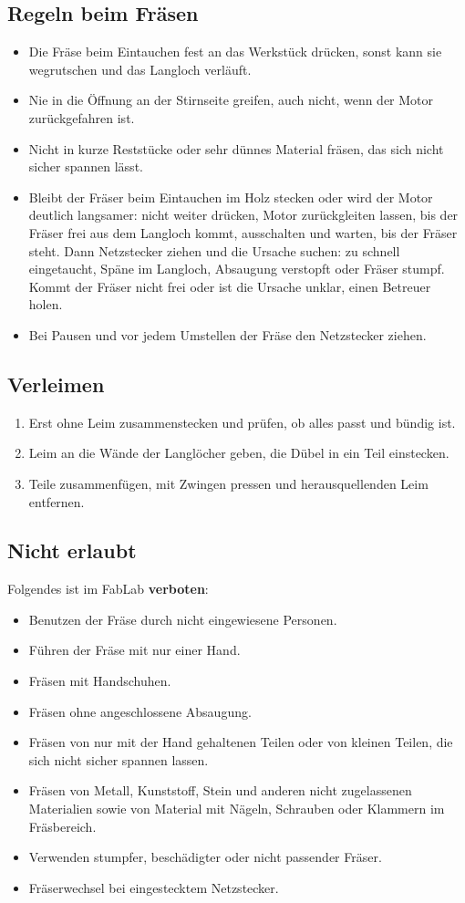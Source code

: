 \documentclass{\basedir/fablab-document}
\begin{document}
	\subsection{Regeln beim Fräsen}
	\begin{itemize}
		\item Die Fräse beim Eintauchen fest an das Werkstück drücken, sonst kann sie wegrutschen und das Langloch verläuft.
		\item Nie in die Öffnung an der Stirnseite greifen, auch nicht, wenn der Motor zurückgefahren ist.
		\item Nicht in kurze Reststücke oder sehr dünnes Material fräsen, das sich nicht sicher spannen lässt.
		\item Bleibt der Fräser beim Eintauchen im Holz stecken oder wird der Motor deutlich langsamer: nicht weiter drücken, Motor zurückgleiten lassen, bis der Fräser frei aus dem Langloch kommt, ausschalten und warten, bis der Fräser steht. Dann Netzstecker ziehen und die Ursache suchen: zu schnell eingetaucht, Späne im Langloch, Absaugung verstopft oder Fräser stumpf. Kommt der Fräser nicht frei oder ist die Ursache unklar, einen Betreuer holen.
		\item Bei Pausen und vor jedem Umstellen der Fräse den Netzstecker ziehen.
	\end{itemize}

	\subsection{Verleimen}
	\begin{enumerate}
		\item Erst ohne Leim zusammenstecken und prüfen, ob alles passt und bündig ist.
		\item Leim an die Wände der Langlöcher geben, die Dübel in ein Teil einstecken.
		\item Teile zusammenfügen, mit Zwingen pressen und herausquellenden Leim entfernen.
	\end{enumerate}

	\subsection{Nicht erlaubt}
	Folgendes ist im FabLab \textbf{verboten}:
	\begin{itemize}
		\item Benutzen der Fräse durch nicht eingewiesene Personen.
		\item Führen der Fräse mit nur einer Hand.
		\item Fräsen mit Handschuhen.
		\item Fräsen ohne angeschlossene Absaugung.
		\item Fräsen von nur mit der Hand gehaltenen Teilen oder von kleinen Teilen, die sich nicht sicher spannen lassen.
		\item Fräsen von Metall, Kunststoff, Stein und anderen nicht zugelassenen Materialien sowie von Material mit Nägeln, Schrauben oder Klammern im Fräsbereich.
		\item Verwenden stumpfer, beschädigter oder nicht passender Fräser.
		\item Fräserwechsel bei eingestecktem Netzstecker.
	\end{itemize}
\end{document}
